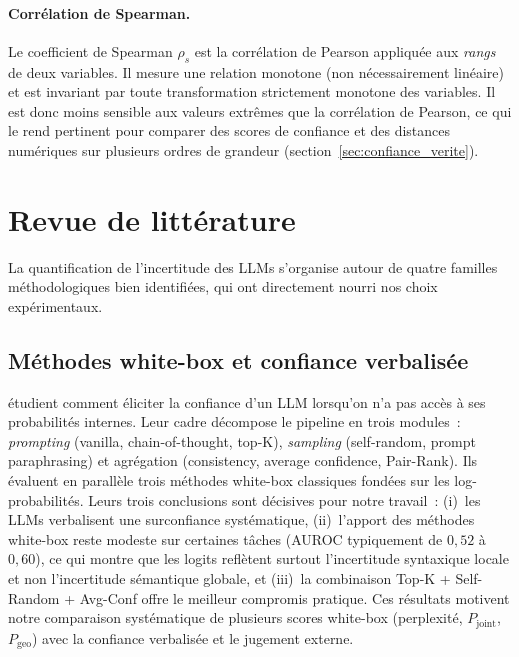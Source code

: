\documentclass[12pt,a4paper]{article}
\begin{document}
\paragraph{Corrélation de Spearman.}
Le coefficient de Spearman $\rho_s$ est la corrélation de Pearson appliquée aux \emph{rangs} de deux variables. Il mesure une relation monotone (non nécessairement linéaire) et est invariant par toute transformation strictement monotone des variables. Il est donc moins sensible aux valeurs extrêmes que la corrélation de Pearson, ce qui le rend pertinent pour comparer des scores de confiance et des distances numériques sur plusieurs ordres de grandeur (section~\ref{sec:confiance_verite}).


\section{Revue de littérature}
\label{sec:revue}

La quantification de l'incertitude des LLMs s'organise autour de quatre familles méthodologiques bien identifiées, qui ont directement nourri nos choix expérimentaux.

\subsection{Méthodes white-box et confiance verbalisée}

\citet{xiong2024} étudient comment éliciter la confiance d'un LLM lorsqu'on n'a pas accès à ses probabilités internes. Leur cadre décompose le pipeline en trois modules~: \textit{prompting} (vanilla, chain-of-thought, top-K), \textit{sampling} (self-random, prompt paraphrasing) et agrégation (consistency, average confidence, Pair-Rank). Ils évaluent en parallèle trois méthodes white-box classiques fondées sur les log-probabilités. Leurs trois conclusions sont décisives pour notre travail~: (i)~les LLMs verbalisent une surconfiance systématique, (ii)~l'apport des méthodes white-box reste modeste sur certaines tâches (AUROC typiquement de $0{,}52$ à $0{,}60$), ce qui montre que les logits reflètent surtout l'incertitude syntaxique locale et non l'incertitude sémantique globale, et (iii)~la combinaison Top-K + Self-Random + Avg-Conf offre le meilleur compromis pratique. Ces résultats motivent notre comparaison systématique de plusieurs scores white-box (perplexité, $P_{\mathrm{joint}}$, $P_{\mathrm{geo}}$) avec la confiance verbalisée et le jugement externe.
\end{document}
